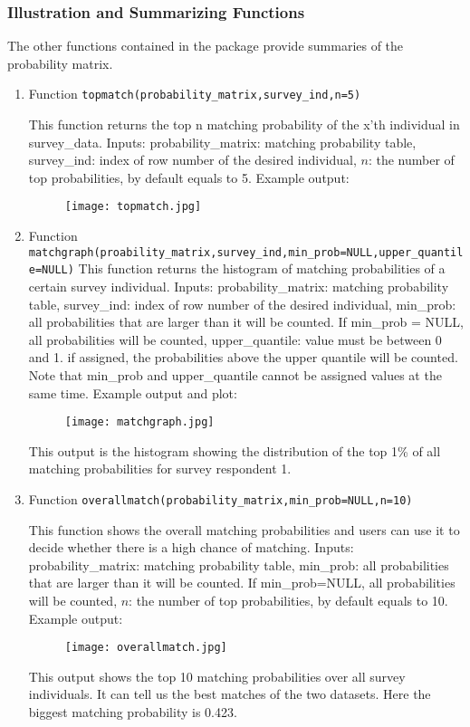 \subsubsection{Illustration and Summarizing Functions}
The other functions contained in the package provide summaries of the probability matrix. 

\begin{enumerate}
\item{Function \texttt{topmatch(probability\_matrix,survey\_ind,n=5)} }

This function returns the top n matching probability of the x'th individual in survey\_data.
Inputs: probability\_matrix: matching probability table, survey\_ind: index of row number of the desired individual, $n$: the number of top probabilities, by default equals to 5.
Example output:
\begin{figure}[h!]
\centering
\texttt{[image: topmatch.jpg]}
\end{figure}
\item {Function \texttt{matchgraph(proability\_matrix,survey\_ind,min\_prob=NULL,upper\_quantile=NULL)}}
This function returns the histogram of matching probabilities of a certain survey individual.
Inputs: probability\_matrix: matching probability table, survey\_ind: index of row number of the desired individual, min\_prob: all probabilities that are larger than it will be counted. If min\_prob = NULL, all probabilities will be counted, upper\_quantile: value must be between 0 and 1. if assigned, the probabilities above the upper quantile will be counted.  
Note that min\_prob and upper\_quantile cannot be assigned values at the same time.
Example output and plot:
\begin{figure}[h!]
\centering
\texttt{[image: matchgraph.jpg]}
\end{figure}

This output is the histogram showing the distribution of the top 1\% of all matching probabilities for survey respondent 1.

\item{Function \texttt{overallmatch(probability\_matrix,min\_prob=NULL,n=10)}}

This function shows the overall matching probabilities and users can use it to decide whether there is a high chance of matching.  
Inputs: probability\_matrix: matching probability table, min\_prob: all probabilities that are larger than it will be counted. If min\_prob=NULL, all probabilities will be counted, $n$: the number of top probabilities, by default equals to 10.
Example output:
\begin{figure}[h!]
\centering
\texttt{[image: overallmatch.jpg]}
\end{figure}

This output shows the top 10 matching probabilities over all survey individuals. It can tell us the best matches of the two datasets. Here the biggest matching probability is 0.423.

\end{enumerate}

